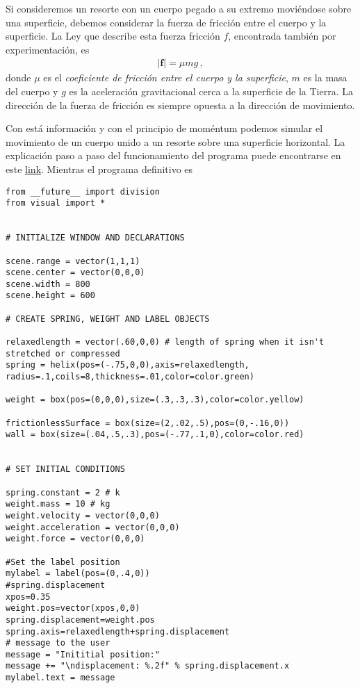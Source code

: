 Si consideremos un resorte con un cuerpo pegado a su extremo moviéndose sobre una superficie, debemos considerar la fuerza de fricción entre el cuerpo y la superficie. La Ley que describe esta fuerza fricción $f$, encontrada también por experimentación, es
\begin{align}
  |\mathbf{f}|=\mu m g\,,
\end{align}
donde $\mu$ es el \emph{coeficiente de fricción entre el cuerpo y la superficie}, $m$ es la masa del cuerpo y $g$ es la aceleración gravitacional cerca a la superficie de la Tierra. La dirección de la fuerza de fricción es siempre opuesta a la dirección de movimiento. 

Con está información y con el principio de moméntum podemos simular el movimiento de un cuerpo unido a un resorte sobre una superficie horizontal. La explicación paso a paso del funcionamiento del programa puede encontrarse en este \href{http://nbviewer.ipython.org/urls/raw.github.com/rescolo/spring/master/spring.ipynb}{link}. Mientras el programa definitivo es

\begin{frame}
\begin{lstlisting}
from __future__ import division
from visual import *


# INITIALIZE WINDOW AND DECLARATIONS

scene.range = vector(1,1,1)
scene.center = vector(0,0,0)
scene.width = 800
scene.height = 600

# CREATE SPRING, WEIGHT AND LABEL OBJECTS

relaxedlength = vector(.60,0,0) # length of spring when it isn't stretched or compressed
spring = helix(pos=(-.75,0,0),axis=relaxedlength, radius=.1,coils=8,thickness=.01,color=color.green)

weight = box(pos=(0,0,0),size=(.3,.3,.3),color=color.yellow)

frictionlessSurface = box(size=(2,.02,.5),pos=(0,-.16,0))
wall = box(size=(.04,.5,.3),pos=(-.77,.1,0),color=color.red)


# SET INITIAL CONDITIONS

spring.constant = 2 # k
weight.mass = 10 # kg
weight.velocity = vector(0,0,0)
weight.acceleration = vector(0,0,0)
weight.force = vector(0,0,0)

#Set the label position
mylabel = label(pos=(0,.4,0))
#spring.displacement
xpos=0.35 
weight.pos=vector(xpos,0,0)
spring.displacement=weight.pos
spring.axis=relaxedlength+spring.displacement
# message to the user
message = "Inititial position:"
message += "\ndisplacement: %.2f" % spring.displacement.x 
mylabel.text = message

\end{lstlisting}
\end{frame}

